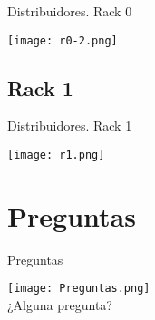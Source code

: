 \documentclass{beamer}
\begin{document}
\begin{frame}{Distribuidores. Rack 0}
\begin{center}
	\texttt{[image: r0-2.png]}
\end{center}
\end{frame}

\subsection{Rack 1}
\begin{frame}{Distribuidores. Rack 1}
\begin{center}
	\texttt{[image: r1.png]}
\end{center}
\end{frame}

\section{Preguntas}
\begin{frame}{Preguntas}
\begin{center}
	\texttt{[image: Preguntas.png]}\\
	¿Alguna pregunta?
\end{center}
\end{frame}
\end{document}
